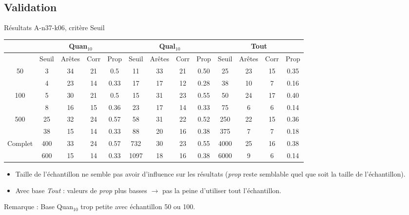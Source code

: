 \documentclass{beamer}
\begin{document}
\subsection{Validation}
\begin{frame}{Résultats A-n37-k06, critère Seuil}

\begin{table}[H]

\begin{tabular}{|@{}c@{}|@{}c@{}|@{}c@{}|@{}c@{}|@{}c@{}||@{}c@{}|@{}c@{}|@{}c@{}|@{}c@{}||@{}c@{}|@{}c@{}|@{}c@{}|@{}c@{}|}

\hline
 & \multicolumn{4}{c|}{Quan$_{10}$} & \multicolumn{4}{c|}{Qual$_{10}$} & \multicolumn{4}{c|}{Tout} \\
 \hline
 & Seuil & Arêtes & Corr & Prop & Seuil & Arêtes & Corr & Prop & Seuil & Arêtes & Corr & Prop \\
 \hline
 50 & 3 & 34 & 21 & 0.5 & 11 & 33 & 21 & 0.50 & 25 & 23 & 15 & 0.35 \\
 \cline{2-13} 
    & 4 & 23 & 14 & 0.33 & 17 & 17 & 12 & 0.28 & 38 & 10 & 7 & 0.16 \\
  \hline
   100 & 5 & 30 & 21 & 0.5 & 15 & 31 & 23 & 0.55 & 50 & 24 & 17 & 0.40 \\
 \cline{2-13} 
    & 8 & 16 & 15 & 0.36 & 23 & 17 & 14 & 0.33 & 75 & 6 & 6 & 0.14 \\
  \hline
   500 & 25 & 32 & 24 & 0.57 & 58 & 31 & 22 & 0.52 & 250 & 22 & 15 & 0.36 \\
 \cline{2-13} 
    & 38 & 15 & 14 & 0.33 & 88 & 20 & 16 & 0.38 & 375 & 7 & 7 & 0.18 \\
  \hline
   Complet & 400 & 33 & 24 & 0.57 & 732 & 30 & 23 & 0.55 & 4000 & 25 & 16 & 0.38 \\
 \cline{2-13} 
    & 600 & 15 & 14 & 0.33 & 1097 & 18 & 16 & 0.38 & 6000 & 9 & 6 & 0.14 \\
  \hline

\end{tabular}
\end{table}
\begin{itemize}
\item Taille de l'échantillon ne semble pas avoir d'influence sur les résultats (\emph{prop} reste semblable quel que soit la taille de l'échantillon).
\item Avec base \emph{Tout} : valeurs de \emph{prop} plus basses $\rightarrow$ pas la peine d'utiliser tout l'échantillon.
\end{itemize}

Remarque : Base Quan$_{10}$ trop petite avec échantillon 50 ou 100.


\end{frame}
\end{document}
